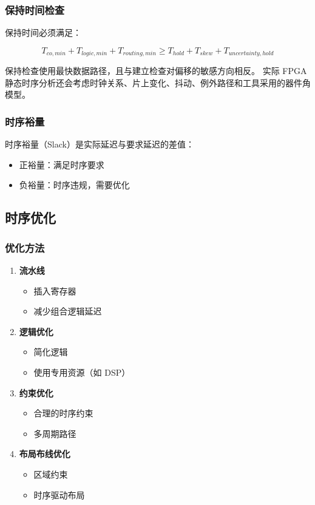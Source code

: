 \subsubsection{保持时间检查}

保持时间必须满足：

\begin{equation}
T_{co,min} + T_{logic,min} + T_{routing,min}
  \geq T_{hold} + T_{skew} + T_{uncertainty,hold} \label{eq:fpga-hold-time}
\end{equation}

保持检查使用最快数据路径，且与建立检查对偏移的敏感方向相反。
实际 FPGA 静态时序分析还会考虑时钟关系、片上变化、抖动、例外路径和工具采用的器件角模型。

\subsubsection{时序裕量}

时序裕量（Slack）是实际延迟与要求延迟的差值：
\begin{itemize}
  \item 正裕量：满足时序要求
  \item 负裕量：时序违规，需要优化
\end{itemize}

\subsection{时序优化}

\subsubsection{优化方法}

\begin{enumerate}
  \item \textbf{流水线}
    \begin{itemize}
      \item 插入寄存器
      \item 减少组合逻辑延迟
    \end{itemize}

  \item \textbf{逻辑优化}
    \begin{itemize}
      \item 简化逻辑
      \item 使用专用资源（如 DSP）
    \end{itemize}

  \item \textbf{约束优化}
    \begin{itemize}
      \item 合理的时序约束
      \item 多周期路径
    \end{itemize}

  \item \textbf{布局布线优化}
    \begin{itemize}
      \item 区域约束
      \item 时序驱动布局
    \end{itemize}
\end{enumerate}

